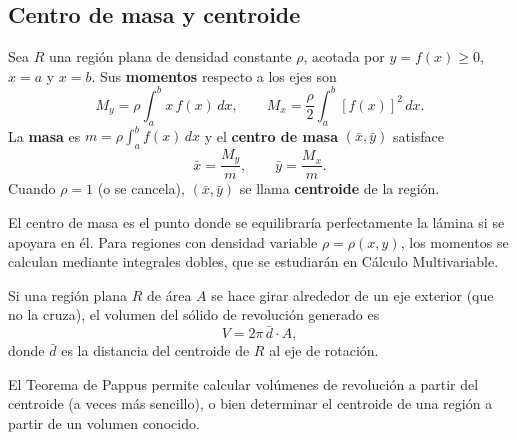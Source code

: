 \subsection{Centro de masa y centroide}

\begin{definition}
Sea $R$ una región plana de densidad constante $\rho$, acotada por
$y=f(x)\geq 0$, $x=a$ y $x=b$. Sus \textbf{momentos} respecto a los ejes
son
\[
  M_y = \rho\int_a^b x\,f(x)\,dx, \qquad
  M_x = \frac{\rho}{2}\int_a^b [f(x)]^2\,dx.
\]
La \textbf{masa} es $m=\rho\int_a^b f(x)\,dx$ y el
\textbf{centro de masa} $(\bar x,\bar y)$ satisface
\[
  \bar{x} = \frac{M_y}{m}, \qquad \bar{y} = \frac{M_x}{m}.
\]
Cuando $\rho=1$ (o se cancela), $(\bar x,\bar y)$ se llama
\textbf{centroide} de la región.
\end{definition}

\begin{rem}
El centro de masa es el punto donde se equilibraría perfectamente la lámina
si se apoyara en él. Para regiones con densidad variable $\rho=\rho(x,y)$,
los momentos se calculan mediante integrales dobles, que se estudiarán en
Cálculo Multivariable.
\end{rem}

\begin{theorem}
Si una región plana $R$ de área $A$ se hace girar alrededor de un eje
exterior (que no la cruza), el volumen del sólido de revolución generado
es
\[
  V = 2\pi\,\bar{d}\cdot A,
\]
donde $\bar{d}$ es la distancia del centroide de $R$ al eje de rotación.
\end{theorem}

\begin{rem}
El Teorema de Pappus permite calcular volúmenes de revolución a partir del
centroide (a veces más sencillo), o bien determinar el centroide de una
región a partir de un volumen conocido.
\end{rem}

